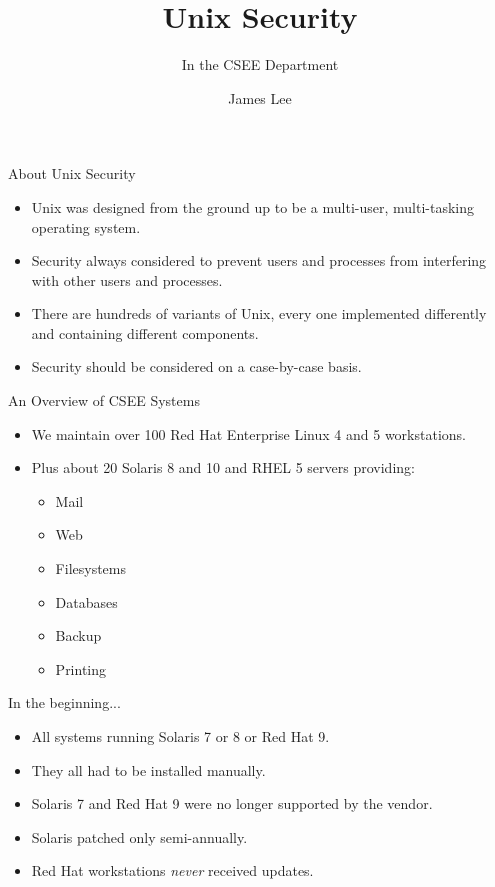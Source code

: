 \documentclass[default,pdf,colorBG,slideColor]{prosper}
\title{Unix Security}
\subtitle{In the CSEE Department}
\author{James Lee}
\begin{document}
\maketitle

\begin{slide}{About Unix Security}
\begin{itemize}
\item Unix was designed from the ground up to be a multi-user, multi-tasking operating system.
\item Security always considered to prevent users and processes from interfering with other users and processes.
\item There are hundreds of variants of Unix, every one implemented differently and containing different components.
\item Security should be considered on a case-by-case basis.
\end{itemize}
\end{slide}

\begin{slide}{An Overview of CSEE Systems}
\begin{itemize}
\item We maintain over 100 Red Hat Enterprise Linux 4 and 5 workstations.
\item Plus about 20 Solaris 8 and 10 and RHEL 5 servers providing:
\begin{itemize}
\item Mail
\item Web
\item Filesystems
\item Databases
\item Backup
\item Printing
\end{itemize}
\end{itemize}
\end{slide}

\begin{slide}{In the beginning...}
\begin{itemize}
\item All systems running Solaris 7 or 8 or Red Hat 9.
\item They all had to be installed manually.
\item Solaris 7 and Red Hat 9 were no longer supported by the vendor.
\item Solaris patched only semi-annually.
\item Red Hat workstations \emph{never} received updates.
\end{itemize}
\end{slide}
\end{document}
